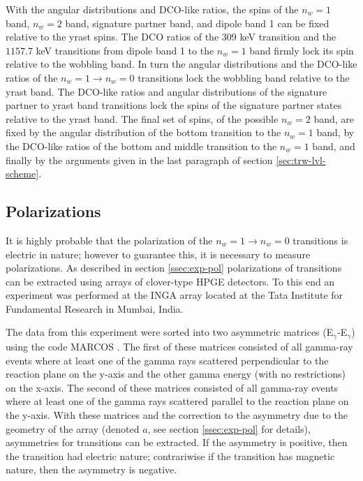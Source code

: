 With the angular distributions and DCO-like ratios, the spins of the $n_w=1$ band, $n_w=2$ band, signature partner band, and dipole band 1 can be fixed relative to the yrast spins. The DCO ratios of the $309$ keV transition and the $1157.7$ keV transitions from dipole band 1 to the $n_w=1$ band firmly lock its spin relative to the wobbling band. In turn the angular distributions and the DCO-like ratios of the $n_w=1\rightarrow{}n_w=0$ transitions lock the wobbling band relative to the yrast band. The DCO-like ratios and angular distributions of the signature partner to yrast band transitions lock the spins of the signature partner states relative to the yrast band. The final set of spins, of the possible $n_w=2$ band, are fixed by the angular distribution of the bottom transition to the $n_w=1$ band, by the DCO-like ratios of the bottom and middle transition to the $n_w=1$ band, and finally by the arguments given in the last paragraph of section \ref{sec:trw-lvl-scheme}.

\subsection{Polarizations}
\label{ssec:trw-lvl-pol}

It is highly probable that the polarization of the $n_w=1\rightarrow{}n_w=0$ transitions is electric in nature; however to guarantee this, it is necessary to measure polarizations. As described in section \ref{ssec:exp-pol} polarizations of transitions can be extracted using arrays of clover-type HPGE detectors. To this end an experiment was performed at the INGA array \cite{ingaAtIUAC,ingaAtIuacConf} located at the Tata Institute for Fundamental Research in Mumbai, India.

The data from this experiment were sorted into two asymmetric matrices (E$_{\gamma}$-E$_{\gamma}$) using the code MARCOS \cite{IngaDigitalDAQ}. The first of these matrices consisted of all gamma-ray events where at least one of the gamma rays scattered perpendicular to the reaction plane on the y-axis and the other gamma energy (with no restrictions) on the x-axis. The second of these matrices consisted of all gamma-ray events where at least one of the gamma rays scattered parallel to the reaction plane on the y-axis. With these matrices and the correction to the asymmetry due to the geometry of the array (denoted $a$, see section \ref{ssec:exp-pol} for details), asymmetries for transitions can be extracted. If the asymmetry is positive, then the transition had electric nature; contrariwise if the transition has magnetic nature, then the asymmetry is negative.

